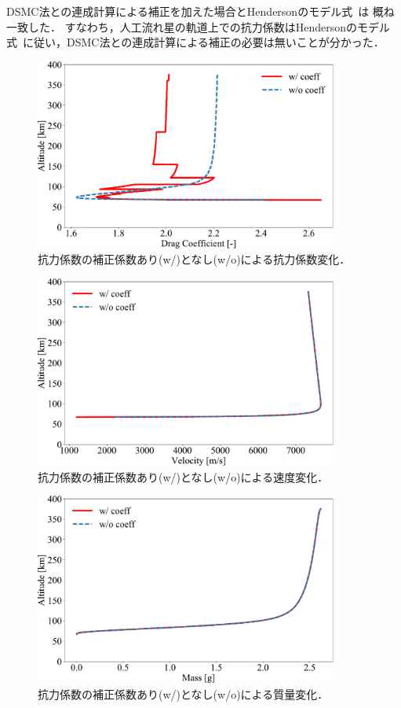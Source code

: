 DSMC法との連成計算による補正を加えた場合とHendersonのモデル式~\cite{henderson1976drag}は
概ね一致した．
すなわち，人工流れ星の軌道上での抗力係数はHendersonのモデル式~\cite{henderson1976drag}に従い，DSMC法との連成計算による補正の必要は無いことが分かった．
\begin{figure}[H]
    \centering
    \includegraphics[width=10cm]{fig/couple/cd-coeff/Cd.pdf}
    \caption{抗力係数の補正係数あり(w/)となし(w/o)による抗力係数変化．}
    \label{fig:couble-cd-cd}
\end{figure}
\begin{figure}[H]
    \centering
    \includegraphics[width=10cm]{fig/couple/cd-coeff/velo.pdf}
    \caption{抗力係数の補正係数あり(w/)となし(w/o)による速度変化．}
    \label{fig:couble-cd-velo}
\end{figure}
\begin{figure}[H]
    \centering
    \includegraphics[width=10cm]{fig/couple/cd-coeff/mass.pdf}
    \caption{抗力係数の補正係数あり(w/)となし(w/o)による質量変化．}
    \label{fig:couble-cd-mass}
\end{figure}
